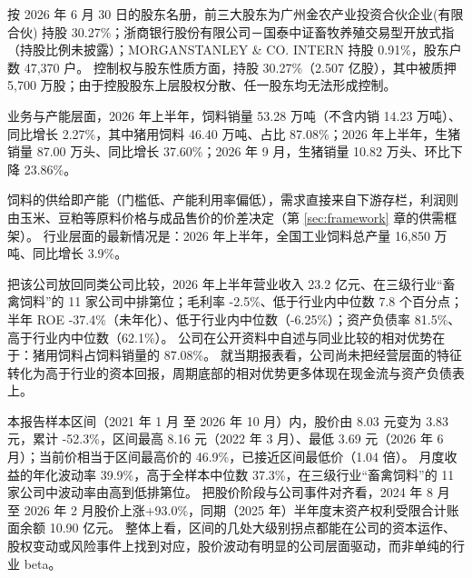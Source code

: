  按 2026 年 6 月 30 日的股东名册，前三大股东为广州金农产业投资合伙企业(有限合伙) 持股 30.27\%；浙商银行股份有限公司－国泰中证畜牧养殖交易型开放式指（持股比例未披露）；MORGANSTANLEY \& CO. INTERN 持股 0.91\%，股东户数 47,370 户。 控制权与股东性质方面，持股 30.27\%（2.507 亿股），其中被质押 5,700 万股；由于控股股东上层股权分散、任一股东均无法形成控制。

 业务与产能层面，2026 年上半年，饲料销量 53.28 万吨（不含内销 14.23 万吨）、同比增长 2.27\%，其中猪用饲料 46.40 万吨、占比 87.08\%；2026 年上半年，生猪销量 87.00 万头、同比增长 37.60\%；2026 年 9 月，生猪销量 10.82 万头、环比下降 23.86\%。

 饲料的供给即产能（门槛低、产能利用率偏低），需求直接来自下游存栏，利润则由玉米、豆粕等原料价格与成品售价的价差决定（第 \ref{sec:framework} 章的供需框架）。 行业层面的最新情况是：2026 年上半年，全国工业饲料总产量 16,850 万吨、同比增长 3.9\%。

 把该公司放回同类公司比较，2026 年上半年营业收入 23.2 亿元、在三级行业“畜禽饲料”的 11 家公司中排第位；毛利率 -2.5\%、低于行业内中位数 7.8 个百分点；半年 ROE -37.4\%（未年化）、低于行业内中位数（-6.25\%）；资产负债率 81.5\%、高于行业内中位数（62.1\%）。 公司在公开资料中自述与同业比较的相对优势在于：猪用饲料占饲料销量的 87.08\%。 就当期报表看，公司尚未把经营层面的特征转化为高于行业的资本回报，周期底部的相对优势更多体现在现金流与资产负债表上。

 本报告样本区间（2021 年 1 月 至 2026 年 10 月）内，股价由 8.03 元变为 3.83 元，累计 -52.3\%，区间最高 8.16 元（2022 年 3 月）、最低 3.69 元（2026 年 6 月）；当前价相当于区间最高价的 46.9\%，已接近区间最低价（1.04 倍）。 月度收益的年化波动率 39.9\%，高于全样本中位数 37.3\%，在三级行业“畜禽饲料”的 11 家公司中波动率由高到低排第位。 把股价阶段与公司事件对齐看，2024 年 8 月 至 2026 年 2 月股价上涨+93.0\%，同期（2025 年）半年度末资产权利受限合计账面余额 10.90 亿元。 整体上看，区间的几处大级别拐点都能在公司的资本运作、股权变动或风险事件上找到对应，股价波动有明显的公司层面驱动，而非单纯的行业 beta。

